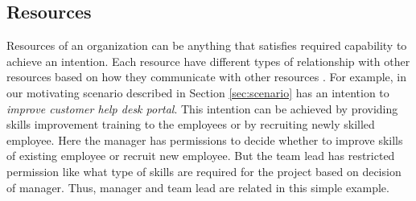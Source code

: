 \subsection{Resources} 
\label{sec:resources}
Resources of an organization can be anything that satisfies required capability to achieve an intention. Each resource have different types of relationship with other resources based on how they communicate with other resources \cite{Sungur2015}. For example, in our motivating scenario described in Section \ref{sec:scenario} has an intention to \textit{improve customer help desk portal}. This intention can be achieved by providing skills improvement training to the employees or by recruiting newly skilled employee. Here the manager has permissions to decide whether to improve skills of existing employee or recruit new employee. But the team lead has restricted permission like what type of skills are required for the project based on decision of manager. Thus, manager and team lead are related in this simple example. 
